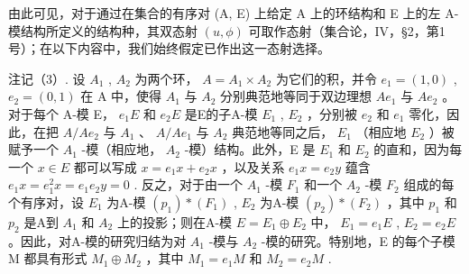 由此可见，对于通过在集合的有序对 (A, E) 上给定 A 上的环结构和 E 上的左 A-模结构所定义的结构种，其双态射 \((u, \phi)\) 可取作态射（集合论，IV，§2，第1号）；在以下内容中，我们始终假定已作出这一态射选择。

注记（3）. 设 \(A_{1}\) , \(A_{2}\) 为两个环， \(A = A_{1} \times A_{2}\) 为它们的积，并令 \(e_{1} = (1, 0)\) , \(e_{2} = (0, 1)\) 在 A 中，使得 \(A_{1}\) 与 \(A_{2}\) 分别典范地等同于双边理想 \(Ae_{1}\) 与 \(Ae_{2}\) 。对于每个 A-模 E， \(e_{1}E\) 和 \(e_{2}E\) 是E的子A-模 \(E_{1}\) , \(E_{2}\) ，分别被 \(e_{2}\) 和 \(e_{1}\) 零化，因此，在把 \(A/Ae_{2}\) 与 \(A_{1}\) 、 \(A/Ae_{1}\) 与 \(A_{2}\) 典范地等同之后， \(E_{1}\) （相应地 \(E_{2}\) ）被赋予一个 \(A_{1}\) -模（相应地， \(A_{2}\) -模）结构。此外，E 是 \(E_{1}\) 和 \(E_{2}\) 的直和，因为每一个 \(x \in E\) 都可以写成 \(x = e_{1}x + e_{2}x\) ，以及关系 \(e_{1}x = e_{2}y\) 蕴含 \(e_{1}x = e_{1}^{2}x = e_{1}e_{2}y = 0\) . 反之，对于由一个 \(A_{1}\) -模 \(F_{1}\) 和一个 \(A_{2}\) -模 \(F_{2}\) 组成的每个有序对，设 \(E_{1}\) 为A-模 \((p_{1}) * (F_{1})\) , \(E_{2}\) 为A-模 \((p_{2}) * (F_{2})\) ，其中 \(p_{1}\) 和 \(p_{2}\) 是A到 \(A_{1}\) 和 \(A_{2}\) 上的投影；则在A-模 \(E = E_{1} \oplus E_{2}\) 中， \(E_{1} = e_{1}E\) , \(E_{2} = e_{2}E\) 。因此，对A-模的研究归结为对 \(A_{1}\) -模与 \(A_{2}\) -模的研究。特别地，E 的每个子模 M 都具有形式 \(M_{1} \oplus M_{2}\) ，其中 \(M_{1} = e_{1}M\) 和 \(M_{2} = e_{2}M\) .

